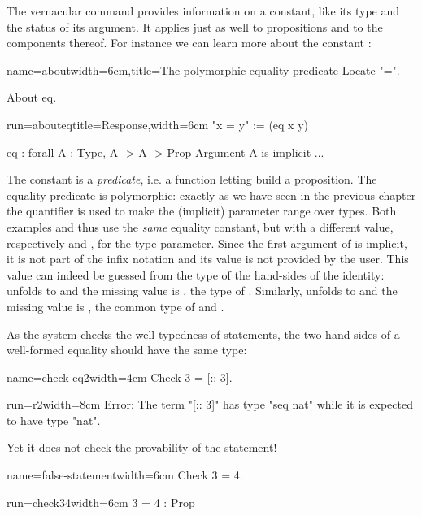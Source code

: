 The  vernacular
command provides information on a constant, like its
type and the status of its argument. It applies just as well to
propositions and to the components thereof. For instance we can learn more
about the constant :

\begin{coq}{name=about}{width=6cm,title=The polymorphic equality predicate}
Locate "=".

About eq.
$~$
\end{coq}
\begin{coqout}{run=abouteq}{title=Response,width=6cm}
"x = y" := (eq x y)

eq : forall A : Type, A -> A -> Prop
Argument A is implicit ...
\end{coqout}

The constant  is a \emph{predicate}, i.e. a function letting
build a proposition. The equality
predicate is polymorphic: exactly as we have seen in the previous
chapter the  quantifier is used to make the (implicit)
parameter  range over types. Both examples  and  thus use the \emph{same} equality constant, but with
a different value, respectively  and , for the type
parameter. Since the first argument of  is implicit, it is not
part of the infix notation and its value is not
provided by the user. This value can indeed be guessed from the type of the
hand-sides of the identity:  unfolds to  and
the missing value is , the type of . Similarly,
 unfolds to 
and the missing value is , the common type of  and
.

As the \Coq{} system checks the well-typedness of statements,
the two hand sides of a well-formed equality should have the same
type:

\begin{coq}{name=check-eq2}{width=4cm}
Check 3 = [:: 3].
$~$
\end{coq}
\begin{coqout}{run=r2}{width=8cm}
Error: The term "[:: 3]" has type "seq nat"
 while it is expected to have type "nat".
\end{coqout}
Yet it does not check the provability of the statement!

\begin{coq}{name=false-statement}{width=6cm}
Check 3 = 4.
\end{coq}
\begin{coqout}{run=check34}{width=6cm}
3 = 4 : Prop
\end{coqout}

